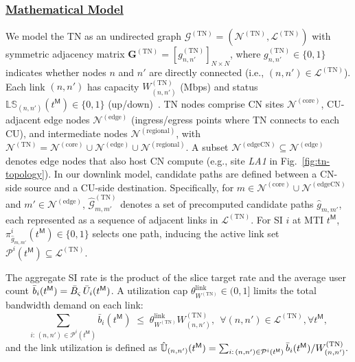 \documentclass[12pt,lettersize,journal,onecolumn]{IEEEtran}
\begin{document}
\subsubsection{\underline{Mathematical Model}}\label{tn-model-subsection}
We model the TN as an undirected graph $\mathcal{G}^{(\mathrm{TN})}=(\mathcal{N}^{(\mathrm{TN})},\mathcal{L}^{(\mathrm{TN})})$ with symmetric adjacency matrix $\boldsymbol{G}^{(\mathrm{TN})}=[g^{(\mathrm{TN})}_{n,n'}]_{N \times N}$, where $g^{(\mathrm{TN})}_{n,n'}\in\{0,1\}$ indicates whether nodes $n$ and $n'$ are directly connected (i.e., $(n,n')\in\mathcal{L}^{(\mathrm{TN})}$). Each link $(n,n')$ has capacity $W^{(\mathrm{TN})}_{(n,n')}$ (Mbps) and status $\mathbb{LS}_{(n,n')}(t^\mathsf{M})\in\{0,1\}$ (up/down)~\cite{tnse25nouruzi}. TN nodes comprise CN sites $\mathcal{N}^{(\text{core})}$, CU-adjacent edge nodes $\mathcal{N}^{(\text{edge})}$ (ingress/egress points where TN connects to each CU), and intermediate nodes $\mathcal{N}^{(\text{regional})}$, with $\mathcal{N}^{(\mathrm{TN})}=\mathcal{N}^{(\text{core})}\cup\mathcal{N}^{(\text{edge})}\cup\mathcal{N}^{(\text{regional})}$. A subset $\mathcal{N}^{(\text{edgeCN})}\subseteq\mathcal{N}^{(\text{edge})}$ denotes edge nodes that also host CN compute (e.g., site \textit{LA1} in Fig.~\ref{fig:tn-topology}). %
In our downlink model, candidate paths are defined between a CN-side source and a CU-side destination. Specifically, for $m\in\mathcal{N}^{(\text{core})}\cup\mathcal{N}^{(\text{edgeCN})}$ and $m'\in\mathcal{N}^{(\text{edge})}$, $\widehat{\mathcal{G}}^{(\mathrm{TN})}_{m,m'}$ denotes a set of precomputed candidate paths $\hat{g}_{m,m'}$, each represented as a sequence of adjacent links in $\mathcal{L}^{(\mathrm{TN})}$. For SI $i$ at MTI $t^\mathsf{M}$, $\pi^{i}_{\hat{g}_{m,m'}}(t^\mathsf{M})\in\{0,1\}$ selects one path, inducing the active link set $\mathcal{P}^{i}(t^\mathsf{M})\subseteq\mathcal{L}^{(\mathrm{TN})}$. %

The aggregate SI rate is the product of the slice target rate and the average user count $\bar{b}_{i}(t^\mathsf{M})=\Bar{B}_{\varsigma}\,\Bar{U}_{i}(t^\mathsf{M})$. A utilization cap $\theta_{W^{(\mathrm{TN})}}^{\text{link}}\in(0,1]$ limits the total bandwidth demand on each link:
$$
\sum_{i:\,(n,n')\in\mathcal{P}^{i}(t^\mathsf{M})}  \bar{b}_{i}(t^\mathsf{M}) \;\le\; \theta_{W^{(\mathrm{TN})}}^{\text{link}} W^{(\mathrm{TN})}_{(n,n')},~~ \forall (n,n')\in\mathcal{L}^{(\mathrm{TN})},\forall t^\mathsf{M}, %
$$
and the link utilization is defined as 
$
\mathbb{\Hat{U}}_{(n,n')}(t^\mathsf{M})=\sum_{i:\,(n,n')\in\mathcal{P}^{i}(t^\mathsf{M})} \bar{b}_{i}(t^\mathsf{M})/W^{(\mathrm{TN})}_{(n,n')} .
$
\end{document}
